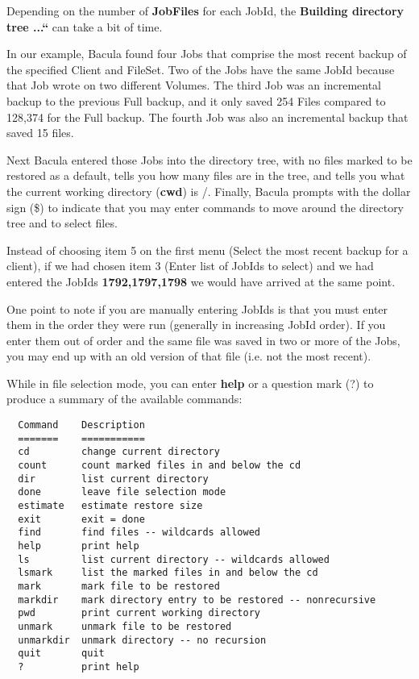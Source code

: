 Depending on the number of {\bf JobFiles} for each JobId, the {\bf Building
directory tree ...``} can take a bit of time. 

In our example, Bacula found four Jobs that comprise the most recent backup of
the specified Client and FileSet. Two of the Jobs have the same JobId because
that Job wrote on two different Volumes. The third Job was an incremental
backup to the previous Full backup, and it only saved 254 Files compared to
128,374 for the Full backup. The fourth Job was also an incremental backup
that saved 15 files. 

Next Bacula entered those Jobs into the directory tree, with no files marked
to be restored as a default, tells you how many files are in the tree, and
tells you what the current working directory ({\bf cwd}) is /. Finally, Bacula
prompts with the dollar sign (\$) to indicate that you may enter commands to
move around the directory tree and to select files. 

Instead of choosing item 5 on the first menu (Select the most recent backup
for a client), if we had chosen item 3 (Enter list of JobIds to select) and we
had entered the JobIds {\bf 1792,1797,1798} we would have arrived at the same
point. 

One point to note if you are manually entering JobIds is that you must enter
them in the order they were run (generally in increasing JobId order). If you
enter them out of order and the same file was saved in two or more of the
Jobs, you may end up with an old version of that file (i.e. not the most
recent). 

While in file selection mode, you can enter {\bf help} or a question mark (?)
to produce a summary of the available commands:  

\footnotesize
\begin{verbatim}
  Command    Description
  =======    ===========
  cd         change current directory
  count      count marked files in and below the cd
  dir        list current directory
  done       leave file selection mode
  estimate   estimate restore size
  exit       exit = done
  find       find files -- wildcards allowed
  help       print help
  ls         list current directory -- wildcards allowed
  lsmark     list the marked files in and below the cd
  mark       mark file to be restored
  markdir    mark directory entry to be restored -- nonrecursive
  pwd        print current working directory
  unmark     unmark file to be restored
  unmarkdir  unmark directory -- no recursion
  quit       quit
  ?          print help
     
\end{verbatim}
\normalsize

